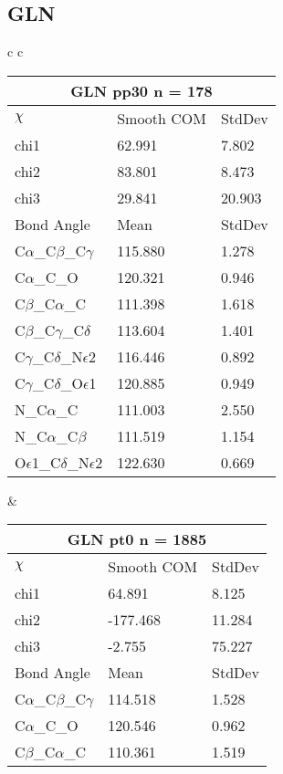 \newpage
\subsection{GLN}

\begin{longtable}{ c c }

  \begin{tabular}{ l l l }
  \toprule
  \multicolumn{3}{c}{GLN \textbf{pp30} n = 178} \\ \toprule
  $\chi$       & Smooth COM & StdDev \\ \midrule
  chi1 & 62.991 & 7.802 \\ 
  chi2 & 83.801 & 8.473 \\ 
  chi3 & 29.841 & 20.903 \\ \midrule
  Bond Angle   & Mean     & StdDev \\ \midrule
  C$\alpha$\_C$\beta$\_C$\gamma$ & 115.880 & 1.278\\
  C$\alpha$\_C\_O & 120.321 & 0.946\\
  C$\beta$\_C$\alpha$\_C & 111.398 & 1.618\\
  C$\beta$\_C$\gamma$\_C$\delta$ & 113.604 & 1.401\\
  C$\gamma$\_C$\delta$\_N$\epsilon$2 & 116.446 & 0.892\\
  C$\gamma$\_C$\delta$\_O$\epsilon$1 & 120.885 & 0.949\\
  N\_C$\alpha$\_C & 111.003 & 2.550\\
  N\_C$\alpha$\_C$\beta$ & 111.519 & 1.154\\
  O$\epsilon$1\_C$\delta$\_N$\epsilon$2 & 122.630 & 0.669\\
  \bottomrule
  \end{tabular}
  &
  \begin{tabular}{ l l l }
  \toprule
  \multicolumn{3}{c}{GLN \textbf{pt0} n = 1885} \\ \toprule
  $\chi$       & Smooth COM & StdDev \\ \midrule
  chi1 & 64.891 & 8.125 \\ 
  chi2 & -177.468 & 11.284 \\ 
  chi3 & -2.755 & 75.227 \\ \midrule
  Bond Angle   & Mean     & StdDev \\ \midrule
  C$\alpha$\_C$\beta$\_C$\gamma$ & 114.518 & 1.528\\
  C$\alpha$\_C\_O & 120.546 & 0.962\\
  C$\beta$\_C$\alpha$\_C & 110.361 & 1.519\\

\end{tabular}
\end{longtable}
